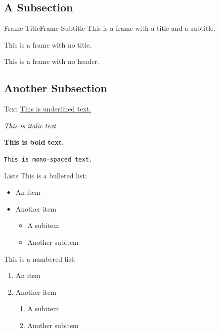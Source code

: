 \documentclass{beamer}
\begin{document}
\subsection{A Subsection}

    \begin{frame}{Frame Title}{Frame Subtitle}
        This is a frame with a title and a subtitle.

    \end{frame}

    \begin{frame}{\null}
        This is a frame with no title.
    \end{frame}

    \begin{frame}
        This is a frame with no header.
    \end{frame}

\subsection{Another Subsection}

    \begin{frame}{Text}
        \underline{This is underlined text.}

        \textit{This is italic text.}

        \textbf{This is bold text.}

        \texttt{This is mono-spaced text.}
    \end{frame}

    \begin{frame}{Lists}
        This is a bulleted list:
        \begin{itemize}
            \item An item

            \item Another item
            \begin{itemize}
                \item A subitem

                \item Another subitem
            \end{itemize}
        \end{itemize}

        This is a numbered list:
        \begin{enumerate}
            \item An item

            \item Another item
            \begin{enumerate}
                \item A subitem

                \item Another subitem
            \end{enumerate}
        \end{enumerate}
    \end{frame}
\end{document}
